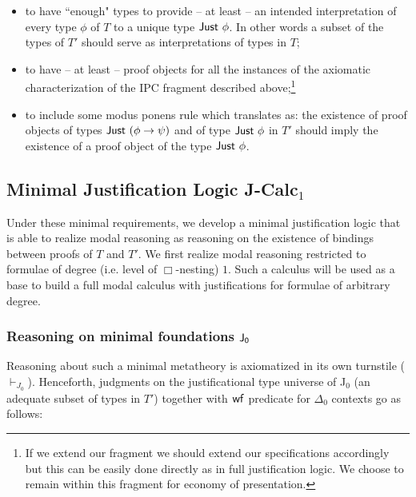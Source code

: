 \documentclass[11pt]{eptcs} %
\begin{document}
\begin{itemize}
\item{to have ``enough" types to provide -- at least -- an intended interpretation of every type $\phi$ of $T$ to a unique type ${\sf Just}\ \phi$. In other words a subset of the types of $T'$ should serve as interpretations of types in $T$;}
\item{to have -- at least -- proof objects for all the instances of the axiomatic characterization of the {\sf IPC} fragment described above;\footnote {If we extend our fragment we should extend our specifications accordingly but this can be easily done directly as in full justification logic. We choose to remain within this fragment for economy of presentation.}}
\item{to include some modus ponens rule which translates as: the existence of  proof objects of types $\sf Just \ (\phi\rightarrow \psi)$ and  of type ${\sf Just\  \phi}$ in $T'$ should imply the existence of a proof object of the type ${\sf Just\  \phi}$. }
\end{itemize}

\subsection{Minimal Justification Logic {\sf J-\sf Calc${_1}$}}

Under these minimal requirements, we develop a minimal justification logic that is able to realize modal reasoning as reasoning on the existence of bindings between proofs of $T$ and $T'$. We first realize modal reasoning restricted to formulae of degree (i.e. level of $\Box$-nesting) $1$. Such a calculus will be used as a base to build a full modal calculus with justifications for formulae of arbitrary degree. 

\subsubsection{\sf Reasoning on minimal foundations ${\sf J_0}$}\label{subsec:J0} 

Reasoning about such a minimal metatheory is axiomatized in its own turnstile ($\vdash_{J_0}$). Henceforth, judgments on the justificational type universe of {\sf J$_0$} (an adequate subset of types in $T'$) together with ${\sf wf}$ predicate for  $\Delta_0$ contexts go as follows: 
\end{document}

